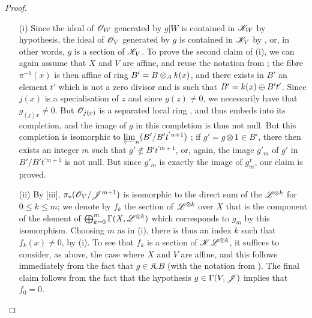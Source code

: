 \begin{proof}
\label{proof-II.8.10.5}
\begin{enumerate}
    \item[\rm{(i)}] Since the ideal of $\mathscr{O}_W$ generated by $g|W$ is contained in $\mathscr{K}_W$ by hypothesis, the ideal of $\mathscr{O}_V$ generated by $g$ is contained in $\mathscr{K}_V$ by , or, in other words, $g$ is a section of $\mathscr{K}_V$.
        To prove the second claim of (i), we can again assume that $X$ and $V$ are affine, and reuse the notation from ;
        the fibre $\pi^{-1}(x)$ is then affine of ring $B'=B\otimes_Ak(x)$, and there exists in $B'$ an element $t'$ which is not a zero divisor and is such that $B'=k(x)\oplus B't'$.
        Since $j(x)$ is a specialisation of $z$ and since $g(z)\neq0$, we necessarily have that $g_{(j)x}\neq0$.
        But $\mathscr{O}_{j(x)}$ is a separated local ring , and thus embeds into its completion, and the image of $g$ in this completion is thus not null.
        But this completion is isomorphic to $\varprojlim_n(B'/B't^{'n+1})$ ;
        if $g'=g\otimes1\in B'$, there then exists an integer $m$ such that $g'\not\in B't^{'m+1}$, or, again, the image $g'_m$ of $g'$ in $B'/B't^{'m+1}$ is not null.
        But since $g'_m$ is exactly the image of $g_m^x$, our claim is proved.
    \item[\rm{(ii)}] By [iii], $\pi_*(\mathscr{O}_V/\mathscr{J}^{m+1})$ is isomorphic to the direct sum of the $\mathscr{L}^{\otimes k}$ for $0\leq k\leq m$;
        we denote by $f_k$ the section of $\mathscr{L}^{\otimes k}$ over $X$ that is the component of the element of $\bigoplus_{k=0}^m\Gamma(X,\mathscr{L}^{\otimes k})$ which corresponds to $g_m$ by this isomorphism.
        Choosing $m$ as in (i), there is thus an index $k$ such that $f_k(x)\neq0$, by (i).
        To see that $f_k$ is a section of $\mathscr{K}\mathscr{L}^{\otimes k}$, it suffices to consider, as above, the case where $X$ and $V$ are affine, and this follows immediately from the fact that $g\in\mathfrak{K}.B$ (with the notation from ).
        The final claim follows from the fact that the hypothesis $g\in\Gamma(V,\mathscr{J})$ implies that $f_0=0$.
\end{enumerate}
\end{proof}

